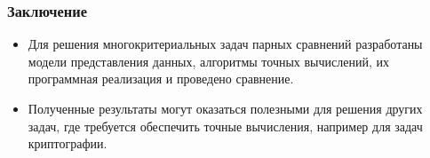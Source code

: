 \documentclass[ucs, notheorems, handout]{beamer}
\begin{document}
    

\begin{frame}
    \frametitle{Заключение}
    \begin{itemize}
        
        
        
        \item Для решения многокритериальных задач парных сравнений разработаны модели представления данных, алгоритмы точных вычислений, их программная реализация и проведено сравнение.
			
        \item Полученные результаты могут оказаться полезными для решения других задач, где требуется обеспечить точные вычисления, например для задач криптографии. 
    \end{itemize}

\end{frame}
\end{document}

